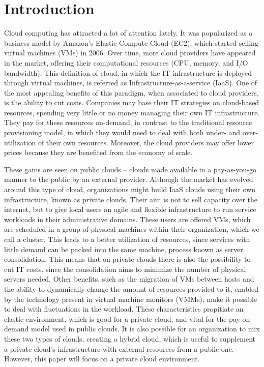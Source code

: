\chapter{\textbf{Introduction}}

\label{Introduction}

Cloud computing has attracted a lot of attention lately. It was popularized as a business model by Amazon's Elastic Compute Cloud (EC2), which started selling virtual machines (VMs) in 2006. Over time, more cloud providers have appeared in the market, offering their computational resources (CPU, memory, and I/O bandwidth). This definition of cloud, in which the IT infrastructure is deployed through virtual machines, is referred as Infrastructure-as-a-service (IaaS). One of the most appealing benefits of this paradigm, when associated to cloud providers, is the ability to cut costs. Companies may base their IT strategies on cloud-based resources, spending very little or no money managing their own IT infrastructure. They pay for these resources on-demand, in contrast to the traditional resource provisioning model, in which they would need to deal with both under- and over- utilization of their own resources. Moreover, the cloud providers may offer lower prices because they are benefited from the economy of 
scale.


These gains are seen on public clouds -- clouds made available in a pay-as-you-go manner to the public by an external provider. Although the market has evolved around this type of cloud, organizations might build IaaS clouds using their own infrastructure, known as private clouds. Their aim is not to sell capacity  over the internet,  but to give local users an agile and flexible infrastructure to run service workloads in their administrative domains. These users are offered VMs, which are scheduled in a group of physical machines within their organization, which we call a cluster. This leads to a better utilization of resources, since services with little demand can be packed into the same machine, process known as server consolidation. This means that on private clouds there is also the possibility to cut IT costs, since the consolidation aims to minimize the number of physical servers needed. Other benefits, such as the migration of VMs between hosts and the ability to dynamically change the 
amount of resources provided to it, enabled by the  technology present in virtual machine monitors (VMMs), make it 
possible to deal with fluctuations in the workload. These characteristics propitiate an elastic environment, which is good for a private cloud, and vital for the pay-on-demand model used in public clouds.  It is also possible for an organization to mix these two types of clouds, creating a hybrid cloud,  which is useful to supplement a private cloud's infrastructure with external resources from a public one. However, this paper will focus on a private cloud environment. 

